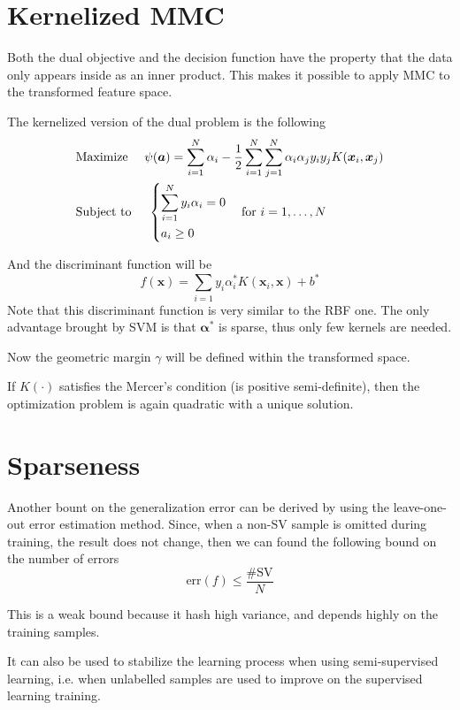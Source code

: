 \documentclass[oneside,onecolumn]{report}
\begin{document}
\section{Kernelized MMC}
Both the dual objective and the decision function have the property that the data only appears inside as an inner product.
This makes it possible to apply MMC to the transformed feature space.

The kernelized version of the dual problem is the following
\begin{align*}
    &\text{Maximize   } \quad \psi(\bm a) = \sum_{i = 1}^N \alpha_i - \frac{1}{2} \sum_{i = 1}^N \sum_{j = 1}^N \alpha_i \alpha_j y_i y_j K(\bm x_i, \bm x_j) \\
    &\text{Subject to } \quad \begin{dcases}
    \sum_{i = 1}^N y_i \alpha_i = 0 \\
    a_i \geq 0
\end{dcases} \quad \text{for } i = 1, \dots, N
\end{align*}

And the discriminant function will be
$$ f(\bm x) = \sum_{i = 1} y_i \alpha_i^* K(\bm x_i, \bm x) + b^* $$
Note that this discriminant function is very similar to the RBF one.
The only advantage brought by SVM is that $\bm \alpha^*$ is sparse, thus only few kernels are needed.

Now the geometric margin $\gamma$ will be defined within the transformed space.

If $K(\cdot)$ satisfies the Mercer's condition (is positive semi-definite), then the optimization problem is again quadratic with a unique solution.

\section{Sparseness}
Another bount on the generalization error can be derived by using the leave-one-out error estimation method.
Since, when a non-SV sample is omitted during training, the result does not change, then we can found the following bound on the number of errors
$$ \text{err}(f) \leq \frac{\#\text{SV}}{N} $$

This is a weak bound because it hash high variance, and depends highly on the training samples.

It can also be used to stabilize the learning process when using semi-supervised learning, i.e. when unlabelled samples are used to improve on the supervised learning training.
\end{document}
